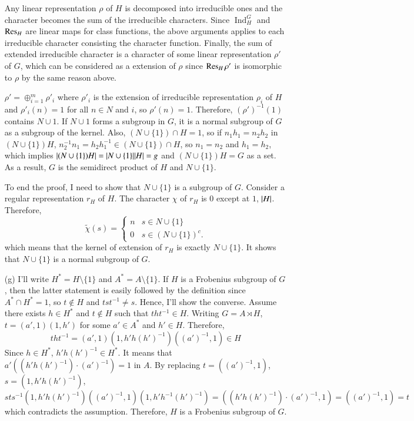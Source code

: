 \documentclass[a4paper, 12pt]{article}
\theoremstyle{Mydefinition}
\theoremstyle{Mytheorem}
\DeclareMathOperator{\Ind}{Ind}
\begin{document}
\begin{enumerate}
    Any linear representation $\rho$ of $H$ is decomposed into irreducible ones and the character becomes the sum of the irreducible characters. Since $\Ind_H^G$ and $\Res_H$ are linear maps for class functions, the above arguments applies to each irreducible character consisting the character function. Finally, the sum of extended irreducible character is a character of some linear representation $\rho'$ of $G$, which can be considered as a extension of $\rho$ since $\Res_H \rho'$ is isomorphic to  $\rho$ by the same reason above.
    
    $\rho' = \oplus_{i=1}^m \rho'_i$ where $\rho'_i$ is the extension of irreducible representation $\rho_i$ of $H$ and $\rho'_i(n) = 1$ for all $n\in N$ and $i$, so $\rho'(n) = 1$. Therefore, $(\rho')^{-1}(1)$ contains $N\cup {1}$. If $N\cup {1}$ forms a subgroup in $G$, it is a normal subgroup of $G$ as a subgroup of the kernel. Also, $(N\cup \{1\})\cap H = 1$, so if $n_1h_1 = n_2h_2$ in $(N\cup \{1\})H$, $n_2^{-1}n_1 = h_2h_1^{-1}\in (N\cup \{1\})\cap H$, so $n_1=n_2$ and $h_1=h_2$, which implies $\abs{(N\cup \{1\})H} = \abs{N\cup \{1\}}\abs{H} = g$ and $(N\cup \{1\})H = G$ as a set. As a result, $G$ is the semidirect product of $H$ and $N\cup \{1\}$.
    
    To end the proof, I need to show that $N\cup \{1\}$ is a subgroup of $G$. Consider a regular representation $r_H$ of $H$. The character $\chi$ of $r_H$ is $0$ except at $1$, $\abs{H}$. Therefore,
    \begin{equation}
        \tilde{\chi}(s) = \begin{cases}
        n & s\in N\cup \{1\}\\
        0 & s\in (N\cup \{1\})^c.
        \end{cases}
    \end{equation}
    which means that the kernel of extension of $r_H$ is exactly $N\cup \{1\}$. It shows that $N\cup \{1\}$ is a normal subgroup of $G$.
    \item[(g)] I'll write $H^* = H\setminus\{1\}$ and $A^* = A\setminus \{1\}$. If $H$ is a Frobenius subgroup of $G$, then the latter statement is easily followed by the definition since $A^*\cap H^* = 1$, so $t\not\in H$ and $tst^{-1}\neq s$. Hence, I'll show the converse. Assume there exists $h\in H^*$ and $t\not\in H$ such that $tht^{-1}\in H$. Writing $G = A\rtimes H$, $t = (a',1)(1,h')$ for some $a'\in A^*$ and $h'\in H$. Therefore,
    \begin{equation}
        tht^{-1} = (a', 1)(1,h'h(h')^{-1})((a')^{-1}, 1)\in H
    \end{equation}
    Since $h\in H^*$, $h'h(h')^{-1}\in H^*$. It means that $a'((h'h(h')^{-1})\cdot (a')^{-1}) = 1$ in $A$. By replacing $t = ((a')^{-1},1)$, $s = (1,h'h(h')^{-1})$,
    \begin{equation}
        sts^{-1}(1,h'h(h')^{-1})((a')^{-1},1)(1,h'h^{-1}(h')^{-1}) = ((h'h(h')^{-1})\cdot (a')^{-1}, 1) = ((a')^{-1}, 1) = t
    \end{equation}
    which contradicts the assumption. Therefore, $H$ is a Frobenius subgroup of $G$.
\end{enumerate}
\end{document}
